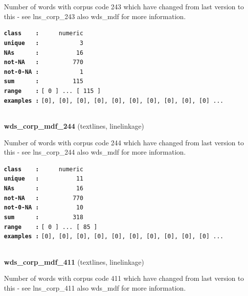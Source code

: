 \documentclass[]{article}
\begin{document}
Number of words with corpus code 243 which have changed from last
version to this - see lns\_corp\_243 also wds\_mdf for more information.

\textbf{\texttt{class\ \ \ \ :}} \texttt{~~~~~numeric}\\
\textbf{\texttt{unique\ \ \ :}} \texttt{~~~~~~~~~~~3}\\
\textbf{\texttt{NAs\ \ \ \ \ \ :}} \texttt{~~~~~~~~~~16}\\
\textbf{\texttt{not-NA\ \ \ :}} \texttt{~~~~~~~~~770}\\
\textbf{\texttt{not-0-NA\ :}} \texttt{~~~~~~~~~~~1}\\
\textbf{\texttt{sum\ \ \ \ \ \ :}} \texttt{~~~~~~~~~115}\\
\textbf{\texttt{range\ \ \ \ :}}
\texttt{{[}\ 0\ {]}\ ...\ {[}\ 115\ {]}}\\
\textbf{\texttt{examples\ :}}
\texttt{{[}0{]},\ {[}0{]},\ {[}0{]},\ {[}0{]},\ {[}0{]},\ {[}0{]},\ {[}0{]},\ {[}0{]},\ {[}0{]},\ {[}0{]}\ ...}\\

~

\textbf{wds\_corp\_mdf\_244} (textlines, linelinkage)

Number of words with corpus code 244 which have changed from last
version to this - see lns\_corp\_244 also wds\_mdf for more information.

\textbf{\texttt{class\ \ \ \ :}} \texttt{~~~~~numeric}\\
\textbf{\texttt{unique\ \ \ :}} \texttt{~~~~~~~~~~11}\\
\textbf{\texttt{NAs\ \ \ \ \ \ :}} \texttt{~~~~~~~~~~16}\\
\textbf{\texttt{not-NA\ \ \ :}} \texttt{~~~~~~~~~770}\\
\textbf{\texttt{not-0-NA\ :}} \texttt{~~~~~~~~~~10}\\
\textbf{\texttt{sum\ \ \ \ \ \ :}} \texttt{~~~~~~~~~318}\\
\textbf{\texttt{range\ \ \ \ :}}
\texttt{{[}\ 0\ {]}\ ...\ {[}\ 85\ {]}}\\
\textbf{\texttt{examples\ :}}
\texttt{{[}0{]},\ {[}0{]},\ {[}0{]},\ {[}0{]},\ {[}0{]},\ {[}0{]},\ {[}0{]},\ {[}0{]},\ {[}0{]},\ {[}0{]}\ ...}\\

~

\textbf{wds\_corp\_mdf\_411} (textlines, linelinkage)

Number of words with corpus code 411 which have changed from last
version to this - see lns\_corp\_411 also wds\_mdf for more information.
\end{document}
